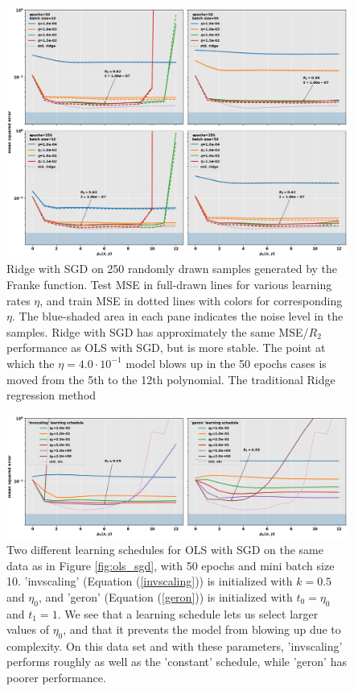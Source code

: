 \documentclass[]{article}
\begin{document}
\begin{figure}[!htb]
	\centering
	\includegraphics[width=1\linewidth]{ridge_sgd.png}
	\caption{Ridge with SGD on 250 randomly drawn samples generated by the Franke function. Test MSE in full-drawn lines for various learning rates $\eta$, and train MSE in dotted lines with colors for corresponding $\eta$. The blue-shaded area in each pane indicates the noise level in the samples. Ridge with SGD has approximately the same MSE/$R_2$ performance as OLS with SGD, but is more stable. The point at which the $\eta = 4.0 \cdot 10^{-1}$ model blows up in the 50 epochs cases is moved from the 5th to the 12th polynomial. The traditional Ridge regression method }
	\label{fig:ridge_sgd}
\end{figure}


\begin{figure}[!htb]
	\centering
	\includegraphics[width=1\linewidth]{ols_sgd_schedules.png}
	\caption{Two different learning schedules for OLS with SGD on the same data as in Figure \ref{fig:ols_sgd}, with 50 epochs and mini batch size 10. 'invscaling' (Equation (\ref{invscaling})) is initialized with $k=0.5$ and $\eta_0$, and 'geron' (Equation (\ref{geron})) is initialized with $t_0 = \eta_0$ and $t_1 = 1$. We see that a learning schedule lets us select larger values of $\eta_0$, and that it prevents the model from blowing up due to complexity. On this data set and with these parameters, 'invscaling' performs roughly as well as the 'constant' schedule, while 'geron' has poorer performance.}
	\label{fig:ols_sgd_schedules}
\end{figure}
\end{document}
